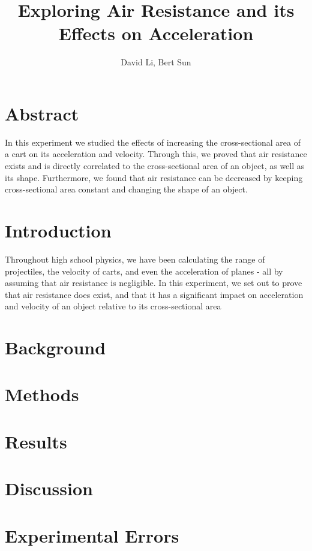 \documentclass[
    letterpaper,
    man,
    floatsintext,
    british
]{apa6}
\title{Exploring Air Resistance and its Effects on Acceleration}
\author{David Li, Bert Sun}
\affiliation{John Fraser Secondary School}
\begin{document}
\maketitle

\section{Abstract}
In this experiment we studied the effects of increasing the cross-sectional area of a cart on its acceleration and velocity.
Through this, we proved that air resistance exists and is directly correlated to the cross-sectional area of an object, as well as its shape. Furthermore, we found that air resistance can be decreased by keeping cross-sectional area constant and changing the shape of an object.

\section{Introduction}

Throughout high school physics, we have been calculating the range of projectiles, the velocity of carts, and even the acceleration of planes - all by assuming that air resistance is negligible.
In this experiment, we set out to prove that air resistance does exist, and that it has a significant impact on acceleration and velocity of an object relative to its cross-sectional area

\section{Background}


\section{Methods}



\newpage
\section{Results}


\section{Discussion}


\section{Experimental Errors}
\end{document}
